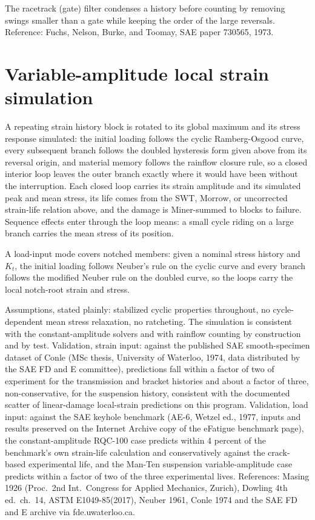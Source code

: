 \documentclass[11pt]{article}
\begin{document}
The racetrack (gate) filter condenses a history before counting by removing
swings smaller than a gate while keeping the order of the large reversals.
Reference: Fuchs, Nelson, Burke, and Toomay, SAE paper 730565, 1973.

\section{Variable-amplitude local strain simulation}
A repeating strain history block is rotated to its global maximum and its
stress response simulated: the initial loading follows the cyclic
Ramberg-Osgood curve, every subsequent branch follows the doubled hysteresis
form given above from its reversal origin, and material memory follows the
rainflow closure rule, so a closed interior loop leaves the outer branch
exactly where it would have been without the interruption. Each closed loop
carries its strain amplitude and its simulated peak and mean stress, its
life comes from the SWT, Morrow, or uncorrected strain-life relation above,
and the damage is Miner-summed to blocks to failure. Sequence effects enter
through the loop means: a small cycle riding on a large branch carries the
mean stress of its position.

A load-input mode covers notched members: given a nominal stress history
and \(K_t\), the initial loading follows Neuber's rule on the cyclic curve
and every branch follows the modified Neuber rule on the doubled curve, so
the loops carry the local notch-root strain and stress.

Assumptions, stated plainly: stabilized cyclic properties throughout, no
cycle-dependent mean stress relaxation, no ratcheting. The simulation is
consistent with the constant-amplitude solvers and with rainflow counting by
construction and by test. Validation, strain input: against the published
SAE smooth-specimen dataset of Conle (MSc thesis, University of Waterloo,
1974, data distributed by the SAE FD and E committee), predictions fall
within a factor of two of experiment for the transmission and bracket
histories and about a factor of three, non-conservative, for the suspension
history, consistent with the documented scatter of linear-damage
local-strain predictions on this program. Validation, load input: against
the SAE keyhole benchmark (AE-6, Wetzel ed., 1977, inputs and results
preserved on the Internet Archive copy of the eFatigue benchmark page), the
constant-amplitude RQC-100 case predicts within 4 percent of the
benchmark's own strain-life calculation and conservatively against the
crack-based experimental life, and the Man-Ten suspension
variable-amplitude case predicts within a factor of two of the three
experimental lives. References: Masing 1926 (Proc.\ 2nd Int.\ Congress for
Applied Mechanics, Zurich), Dowling 4th ed.\ ch.~14, ASTM E1049-85(2017),
Neuber 1961, Conle 1974 and the SAE FD and E archive via fde.uwaterloo.ca.
\end{document}
